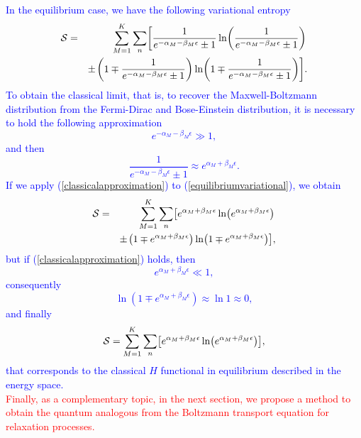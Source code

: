 \textcolor{blue}{In the equilibrium case, we have the following variational entropy
\begin{eqnarray}
    \Ss&=& \sum_{M=1}^{K}\sum_{n}
        \left[
                \frac{1}{e^{-\alpha_M-\beta_M \epsilon}\pm 1} \ln 
                    \left(
                            \frac{1}{e^{-\alpha_M-\beta_M \epsilon}\pm 1}
                    \right)
        \right. \nonumber \\
          && \pm \left. \left(
                        1 \mp \frac{1}{e^{-\alpha_M-\beta_M \epsilon}\pm 1}
                  \right) \ln
                \left(
                        1 \mp \frac{1}{e^{-\alpha_M-\beta_M \epsilon}\pm 1}            
                \right) \right]. \label{equilibriumvariational}
\end{eqnarray}
To obtain the classical limit, that is, to recover the Maxwell-Boltzmann distribution from the Fermi-Dirac and Bose-Einstein distribution, it is necessary to hold the following approximation
\begin{equation}
    e^{-\alpha_M-\beta_M \epsilon}\gg 1, \label{classicalapproximation}
\end{equation}
and then
\begin{equation}
    \frac{1}{e^{-\alpha_M-\beta_M \epsilon}\pm 1} \approx e^{\alpha_M+\beta_M \epsilon}.
\end{equation}
If we apply (\ref{classicalapproximation}) to (\ref{equilibriumvariational}), we obtain
\begin{eqnarray}
    \Ss&=& \sum_{M=1}^{K}\sum_{n}
        \left[
                e^{\alpha_M+\beta_M \epsilon} \ln 
                    \left(
                            e^{\alpha_M+\beta_M \epsilon}
                    \right)
        \right. \nonumber \\
          && \pm \left. \left(
                        1 \mp e^{\alpha_M+\beta_M \epsilon}
                  \right) \ln
                \left(
                        1 \mp e^{\alpha_M+\beta_M \epsilon}            
                \right) \right],
\end{eqnarray}
but if (\ref{classicalapproximation}) holds, then 
\begin{equation}
     e^{\alpha_M+\beta_M \epsilon}\ll 1,
\end{equation}
consequently 
\begin{equation}
    \ln(1\mp e^{\alpha_M+\beta_M \epsilon}) \approx \ln 1 \approx 0,
\end{equation}
and finally
\begin{equation}
    \Ss=\sum_{M=1}^{K}\sum_{n}
        \left[
                e^{\alpha_M+\beta_M \epsilon} \ln 
                    \left(
                            e^{\alpha_M+\beta_M \epsilon}
                    \right)
        \right],
\end{equation}
that corresponds to the classical $H$ functional in equilibrium described in the energy space.}\\
\textcolor{red}{Finally, as a complementary topic, in the next section, we propose a method to obtain the quantum analogous from the Boltzmann transport equation for relaxation processes.}

